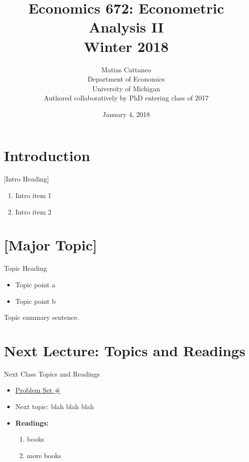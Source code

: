 \documentclass[fleqn, 10pt]{beamer}
\title[Econ-672]{Economics 672: Econometric Analysis II \\ Winter 2018}
\author[M. Cattaneo]{Matias Cattaneo \\
        Department of Economics \\
        University of Michigan \\
        Authored collaboratively by PhD entering class of 2017
        }
\date{January 4, 2018}
\begin{document}


\begin{frame}[plain]
    \titlepage
\end{frame}


\section{Introduction}

\begin{frame}{[Intro Heading]}
    \begin{enumerate}
		\item Intro item 1
		\item Intro item 2
	\end{enumerate}
\end{frame}


\section{[Major Topic]}

\begin{frame}{Topic Heading}

    \begin{itemize}
		\item Topic point a
		\item Topic point b
	\end{itemize}
	Topic summary sentence.
	
\end{frame}


\section{Next Lecture: Topics and Readings}

\begin{frame}{Next Class Topics and Readings}
	
	\begin{itemize}
		\item \underline{Problem Set \#}
		\item Next topic: blah blah blah
		\item \textbf{Readings:}
		\begin{enumerate}
			\item books
			\item more books
		\end{enumerate}
	\end{itemize}
	
\end{frame}
\end{document}
